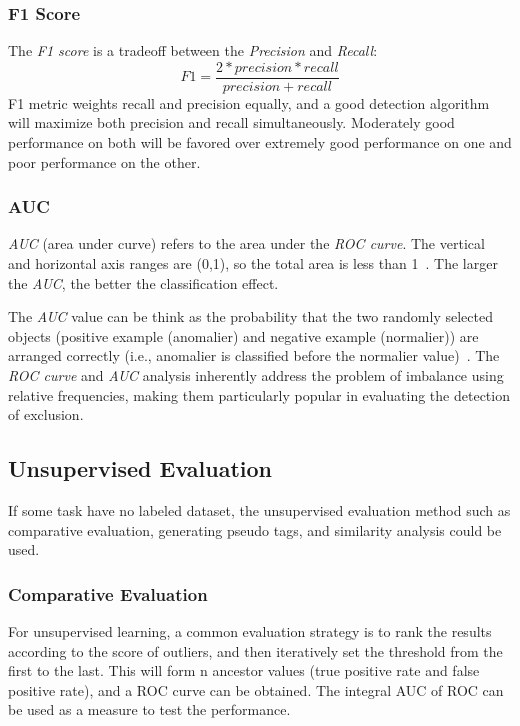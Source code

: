\subsubsection{F1 Score}
The \textit{F1 score} is a tradeoff between
the \textit{Precision} and \textit{Recall}:
\begin{equation}
  F1=\frac{2*precision*recall}{precision+recall}
\end{equation}
F1 metric weights recall and
precision equally,
and a good detection algorithm will
maximize both precision and
recall simultaneously.
Moderately good performance on
both will be favored over
extremely good performance on
one and poor performance on the other.

\subsubsection{AUC}
\textit{AUC} (area under curve) refers to the area under the \textit{ROC curve}.
The vertical and horizontal axis ranges are (0,1),
so the total area is less than 1~\cite{bradley1997use}.
The larger the \textit{AUC},
the better the classification effect.

The \textit{AUC} value can be think as the probability that 
the two randomly selected objects (positive example (anomalier) 
and negative example (normalier)) are arranged correctly 
(i.e.,
anomalier is classified before the normalier value)~\cite{hanley1982meaning}.
The \textit{ROC curve} and \textit{AUC} 
analysis inherently address the problem of imbalance using
relative frequencies,
making them particularly popular in evaluating 
the detection of exclusion.


\subsection{Unsupervised Evaluation}
If some task have no labeled dataset,
the unsupervised evaluation method
such as comparative evaluation,
generating pseudo tags,
and similarity analysis could be used.

\subsubsection{Comparative Evaluation}

For unsupervised learning,
a common evaluation strategy is to rank the
results according to the score of outliers,
and then iteratively set the threshold from
the first to the last.
This will form n ancestor values
(true positive rate and false positive rate),
and a ROC curve can be obtained.
The integral AUC of ROC can be used as a measure
to test the performance.


